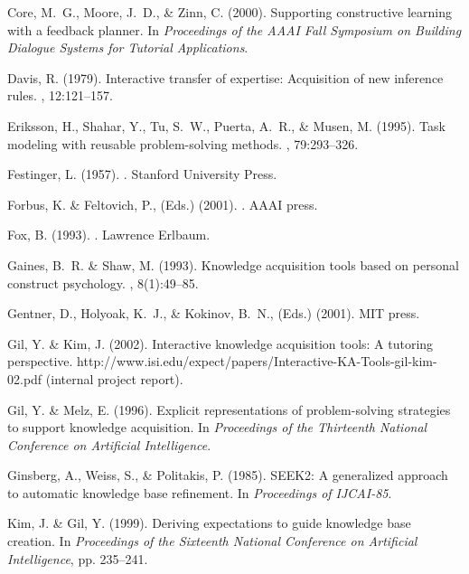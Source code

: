 \documentclass{llncs}
\begin{document}
\begin{thebibliography}{}
Core, M.~G., Moore, J.~D., \& Zinn, C. (2000).
\newblock Supporting constructive learning with a feedback planner.
\newblock In {\em Proceedings of the AAAI Fall Symposium on Building Dialogue
  Systems for Tutorial Applications}.

Davis, R. (1979).
\newblock Interactive transfer of expertise: Acquisition of new inference
  rules.
, 12:121--157.

Eriksson, H., Shahar, Y., Tu, S.~W., Puerta, A.~R., \& Musen, M. (1995).
\newblock Task modeling with reusable problem-solving methods.
, 79:293--326.

Festinger, L. (1957).
.
\newblock Stanford University Press.

Forbus, K. \& Feltovich, P., {\rm (Eds.)} (2001).
.
\newblock AAAI press.

Fox, B. (1993).
.
\newblock Lawrence Erlbaum.

Gaines, B.~R. \& Shaw, M. (1993).
\newblock Knowledge acquisition tools based on personal construct psychology.
, 8(1):49--85.

Gentner, D., Holyoak, K.~J., \& Kokinov, B.~N., {\rm (Eds.)} (2001).
\newblock MIT press.

Gil, Y. \& Kim, J. (2002).
\newblock Interactive knowledge acquisition tools: A tutoring perspective.
\newblock http://www.isi.edu/expect/papers/Interactive-KA-Tools-gil-kim-02.pdf
(internal project report).

Gil, Y. \& Melz, E. (1996).
\newblock Explicit representations of problem-solving strategies to support
  knowledge acquisition.
\newblock In {\em Proceedings of the Thirteenth National Conference on
  Artificial Intelligence}.

Ginsberg, A., Weiss, S., \& Politakis, P. (1985).
\newblock SEEK2: A generalized approach to automatic knowledge base refinement.
\newblock In {\em Proceedings of IJCAI-85}.

Kim, J. \& Gil, Y. (1999).
\newblock Deriving expectations to guide knowledge base creation.
\newblock In {\em Proceedings of the Sixteenth National Conference on
  Artificial Intelligence}, pp. 235--241.


\end{thebibliography}
\end{document}
